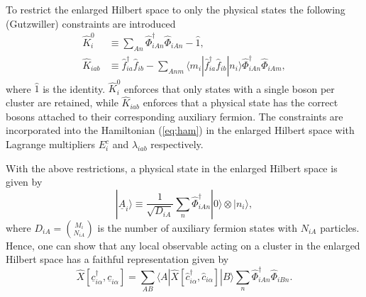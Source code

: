 \documentclass[reprint,aps,prb,amsmath,amssymb]{revtex4-2}
\begin{document}
To restrict the enlarged Hilbert space to only the physical states the following (Gutzwiller) constraints are introduced
%
\begin{align}
\hat{K}_i^0 & \equiv \sum_{An} \hat{\Phi}_{iAn}^{\dagger} \hat{\Phi}_{iAn}^{} - \hat{1}, \\
%
\hat{K}_{iab} & \equiv \hat{f}_{ia}^{\dagger} \hat{f}_{ib}^{} - \sum_{Anm} \langle m_i | \hat{f}_{ia}^{\dagger} \hat{f}_{ib}^{} | n_i \rangle \hat{\Phi}_{iAn}^{\dagger} \hat{\Phi}_{iAm},
\end{align}
%
where $\hat{1}$ is the identity. $\hat{K}_i^0$ enforces that only states with a single boson per cluster are retained, while $\hat{K}_{iab}$ enforces that a physical state has the correct bosons attached to their corresponding auxiliary fermion. The constraints are incorporated into the Hamiltonian (\cref{eq:ham}) in the enlarged Hilbert space with Lagrange multipliers $E_i^c$ and $\lambda_{iab}$ respectively.

With the above restrictions, a physical state in the enlarged Hilbert space is given by
%
\begin{equation}
|\underline{A}_{i} \rangle \equiv \frac{1}{\sqrt{D_{iA}}} \sum_n \hat{\Phi}_{iAn}^{\dagger} |0\rangle \otimes |n_i \rangle,
\end{equation}
%
where $D_{iA} = {M_i \choose N_{iA}}$ is the number of auxiliary fermion states with $N_{iA}$ particles. Hence, one can show that any local observable acting on a cluster in the enlarged Hilbert space has a faithful representation given by \cite{Lechermann2007}
%
\begin{equation}
	\hat{X} [ \underline{c}_{i\alpha}^{\dagger}, \underline{c}_{i\alpha}^{} ] = \sum_{AB} \langle A | \hat{X} [ \hat{c}_{i\alpha}^{\dagger}, \hat{c}_{i\alpha}^{} ] | B \rangle \sum_n \hat{\Phi}_{iAn}^{\dagger} \hat{\Phi}_{iBn}^{}.
\end{equation}
\end{document}
